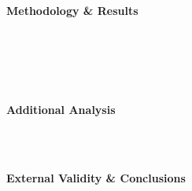 \documentclass{beamer}
\begin{document}
\begin{frame}
\begin{columns}[T]
        \begin{column}{0.45\textwidth}
            \centering
            \textbf{Methodology \& Results}
            \vspace{0.1cm}
            
            \hyperlink{frame:research}{}\\[2pt]
            \hyperlink{frame:empirical}{}\\[2pt]
            \hyperlink{frame:eventstudy}{}\\[2pt]
            \hyperlink{frame:twfe_gpa_2_4_6_8}{}\\[2pt]
            \hyperlink{frame:twfe_gpa_2_4_8}{}
            \hyperlink{frame:twfe_gpa_controls}{}

            
            
            \vspace{0.2cm}
            \textbf{Additional Analysis}
            \vspace{0.1cm}
        
            \hyperlink{frame:otherstrategies}{}\\[2pt]
            \hyperlink{frame:iv_intro}{} \\[2pt]
            \hyperlink{frame:expectations}{}

            \vspace{0.2cm}
            \textbf{External Validity \& Conclusions}
            \vspace{0.1cm}
            
            \hyperlink{frame:pisadata}{} \\[2pt]
            \hyperlink{frame:pisagaps}{} \\[2pt]
            \hyperlink{frame:pisaclosure}{} \\[2pt]
            \hyperlink{frame:conclusions}{}
            
        \end{column}
    \end{columns}
    

\end{frame}
\end{document}
